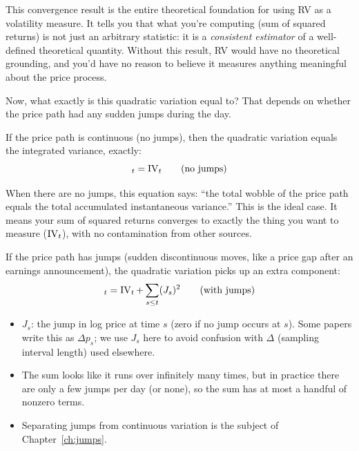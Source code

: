 \begin{projectconnection}
This convergence result is the entire theoretical foundation for using RV as a volatility measure.
It tells you that what you're computing (sum of squared returns) is not just an arbitrary statistic: it is a \emph{consistent estimator} of a well-defined theoretical quantity.
Without this result, RV would have no theoretical grounding, and you'd have no reason to believe it measures anything meaningful about the price process.
\end{projectconnection}

Now, what exactly is this quadratic variation equal to?
That depends on whether the price path had any sudden jumps during the day.

If the price path is continuous (no jumps), then the quadratic variation equals the integrated variance, exactly:
\begin{equation}
  [p]_t = \IVol_t \qquad (\text{no jumps})
  \label{eq:qv-equals-iv}
\end{equation}

\begin{intuition}
When there are no jumps, this equation says: ``the total wobble of the price path equals the total accumulated instantaneous variance.''
This is the ideal case.
It means your sum of squared returns converges to exactly the thing you want to measure ($\operatorname{IV}_t$), with no contamination from other sources.
\end{intuition}

If the price path has jumps (sudden discontinuous moves, like a price gap after an earnings announcement), the quadratic variation picks up an extra component:
\begin{equation}
  [p]_t = \IVol_t + \sum_{s \leq t} (J_s)^2 \qquad (\text{with jumps})
  \label{eq:qv-with-jumps}
\end{equation}
\begin{itemize}[nosep]
  \item $J_s$: the jump in log price at time $s$ (zero if no jump occurs at $s$). Some papers write this as $\Delta p_s$; we use $J_s$ here to avoid confusion with $\Delta$ (sampling interval length) used elsewhere.
  \item The sum looks like it runs over infinitely many times, but in practice there are only a few jumps per day (or none), so the sum has at most a handful of nonzero terms.
  \item Separating jumps from continuous variation is the subject of Chapter~\ref{ch:jumps}.
\end{itemize}

